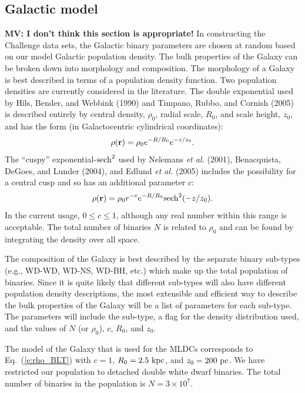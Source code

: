 \documentclass[12pt]{iopart}
\def\be{\begin{equation}}
\def\ee{\end{equation}}
\begin{document}
\subsection{Galactic model}
\label{ss:galaxy}

\textbf{MV: I don't think this section is appropriate!}
In constructing the Challenge data sets, the Galactic binary parameters are chosen at random based on our model Galactic population density. The bulk properties of the Galaxy can be broken down into morphology and composition. The morphology of a Galaxy is best described in terms of a population density function. Two population densities are currently considered in the literature. The double exponential used by Hils, Bender, and Webbink (1990) and Timpano, Rubbo, and Cornish (2005) is described entirely by central density, $\rho_0$, radial scale, $R_0$, and scale height, $z_0$, and has the form (in Galactocentric cylindrical coordinates):
\begin{equation}
\rho({\bf r}) = \rho_0 e^{-R/R_0} e^{-z/z_0}. 
\end{equation}
The ``cuspy'' exponential-${\rm sech}^2$ used by Nelemans {\it et al.} (2001), Benacquista, DeGoes, and Lunder (2004), and Edlund {\it et al.} (2005) includes the possibility for a central cusp and so has an additional parameter $c$:
\be
\rho({\bf r}) = \rho_0 r^{-c} e^{-R/R_0} {\rm sech}^2(-z/z_0).
\label{e:rho_BLT}
\ee
In the current usage, $0\le c \le 1$, although any real number within this range is acceptable. The total number of binaries $N$ is related to $\rho_0$ and can be found by integrating the density over all space.

The composition of the Galaxy is best described by the separate binary sub-types (e.g., WD-WD, WD-NS, WD-BH, etc.) which make up the total population of binaries. Since it is quite likely that different sub-types will also have different population density descriptions, the most extensible and efficient way to describe the bulk properties of the Galaxy will be a list of parameters for each sub-type. The parameters will include the sub-type, a flag for the density distribution used, and the values of $N$ (or $\rho_0$), $c$, $R_0$, and $z_0$.

The model of the Galaxy that is used for the MLDCs corresponds to Eq.~(\ref{e:rho_BLT}) with $c = 1$, $R_0 = 2.5~{\rm  kpc}$, and $z_0 = 200~{\rm pc}$. We have restricted  our population to detached double white dwarf binaries. The total number of binaries in the population is $N = 3 \times 10^7$.
\end{document}
